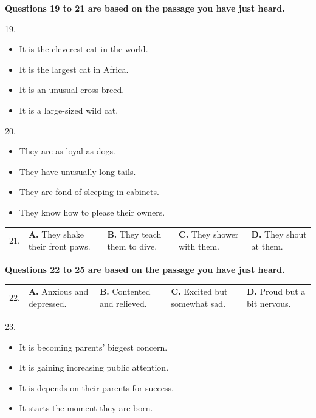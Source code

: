 \documentclass[UTF8,11pt]{ctexart}
\begin{document}
\textbf{Questions 19 to 21 are based on the passage you have just heard.}


19.


\begin{itemize}[leftmargin=2em,itemsep=.2em,topsep=.4em]\item[A.] It is the cleverest cat in the world.
\item[B.] It is the largest cat in Africa.
\item[C.] It is an unusual cross breed.
\item[D.] It is a large-sized wild cat.
\end{itemize}

20.


\begin{itemize}[leftmargin=2em,itemsep=.2em,topsep=.4em]\item[A.] They are as loyal as dogs.
\item[B.] They have unusually long tails.
\item[C.] They are fond of sleeping in cabinets.
\item[D.] They know how to please their owners.
\end{itemize}

\noindent\begin{tabularx}{\linewidth}{@{}lXXXX@{}}21. & \textbf{A.} They shake their front paws. & \textbf{B.} They teach them to dive. & \textbf{C.} They shower with them. & \textbf{D.} They shout at them.\\\end{tabularx}\par

\textbf{Questions 22 to 25 are based on the passage you have just heard.}


\noindent\begin{tabularx}{\linewidth}{@{}lXXXX@{}}22. & \textbf{A.} Anxious and depressed. & \textbf{B.} Contented and relieved. & \textbf{C.} Excited but somewhat sad. & \textbf{D.} Proud but a bit nervous.\\\end{tabularx}\par

23.


\begin{itemize}[leftmargin=2em,itemsep=.2em,topsep=.4em]\item[A.] It is becoming parents’ biggest concern.
\item[B.] It is gaining increasing public attention.
\item[C.] It is depends on their parents for success.
\item[D.] It starts the moment they are born.
\end{itemize}
\end{document}
